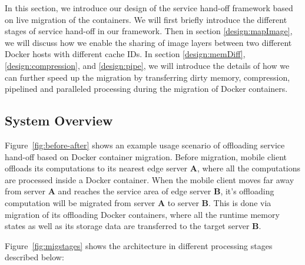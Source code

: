 
In this section, we introduce our design of the  service hand-off framework based on live migration of the containers. We will first briefly introduce the different stages of service hand-off in our framework. Then in section \ref{design:mapImage}, we will discuss how we enable the sharing of image layers between two different Docker hosts with different cache IDs. In section \ref{design:memDiff}, \ref{design:compression}, and \ref{design:pipe}, we will introduce the details of how we can further speed up the migration by transferring dirty memory, compression, pipelined and paralleled processing during the migration of Docker containers.

\subsection{System Overview}




Figure~\ref{fig:before-after} shows an example usage scenario of offloading service hand-off based on Docker container migration. Before migration, mobile client offloads its computations to its nearest edge server \textbf{A}, where all the computations are processed inside a Docker container. When the mobile client moves far away from server \textbf{A} and reaches the service area of edge server \textbf{B}, it's offloading computation will be migrated from server \textbf{A} to server \textbf{B}. This is done via migration of its offloading Docker containers, where all the runtime memory states as well as its storage data are transferred to the target server \textbf{B}.

Figure~\ref{fig:migstages} shows the architecture in different processing stages described below:

